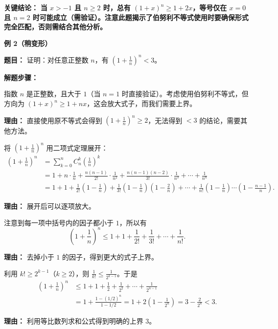 \begin{examplebox}
\textbf{\textcolor{CExample}{关键结论：}} \textbf{当 $x > -1$ 且 $n \geq 2$ 时，总有 $(1+x)^n \geq 1+2x$，等号仅在 $x=0$ 且 $n=2$ 时可能成立（需验证）。注意此题揭示了伯努利不等式使用时要确保形式完全匹配，否则需结合其他分析。}

\medskip
\textbf{\textcolor{CExample}{例 2（稍变形）}}

\textbf{\textcolor{CExample}{题目：}} 证明：对任意正整数 $n$，有 $\left(1+\frac{1}{n}\right)^n < 3$。

\textbf{\textcolor{CExample}{解题步骤：}}
\begin{description}[style=nextline, leftmargin=2.8em, labelsep=0.5em, itemsep=0.45em]
    \item[\textbf{第一步（观察指数）：}] 指数 $n$ 是正整数，且大于 $1$（当 $n=1$ 时直接验证）。考虑使用伯努利不等式，但方向为 $(1+x)^n \geq 1+nx$，这会放大式子，而我们需要上界。
    \par\textbf{理由：} 直接使用原不等式会得到 $\left(1+\frac{1}{n}\right)^n \geq 2$，无法得到 $<3$ 的结论，需要其他方法。

    \item[\textbf{第二步（利用二项式展开）：}] 将 $\left(1+\frac{1}{n}\right)^n$ 用二项式定理展开：
    \[
    \begin{aligned}
    \left(1+\frac{1}{n}\right)^n &= \sum_{k=0}^{n} C_n^k \left(\frac{1}{n}\right)^k \\
    &= 1 + n \cdot \frac{1}{n} + \frac{n(n-1)}{2!} \cdot \frac{1}{n^2} + \frac{n(n-1)(n-2)}{3!} \cdot \frac{1}{n^3} + \cdots + \frac{1}{n^n} \\
    &= 1 + 1 + \frac{1}{2!}\left(1-\frac{1}{n}\right) + \frac{1}{3!}\left(1-\frac{1}{n}\right)\left(1-\frac{2}{n}\right) + \cdots + \frac{1}{n!}\left(1-\frac{1}{n}\right)\cdots\left(1-\frac{n-1}{n}\right).
    \end{aligned}
    \]
    \par\textbf{理由：} 展开后可以逐项放大。

    \item[\textbf{第三步（逐项放大）：}] 注意到每一项中括号内的因子都小于 $1$，所以有
    \[
    \left(1+\frac{1}{n}\right)^n \leq 1 + 1 + \frac{1}{2!} + \frac{1}{3!} + \cdots + \frac{1}{n!}.
    \]
    \par\textbf{理由：} 去掉小于 $1$ 的因子，得到更大的式子上界。

    \item[\textbf{第四步（进一步放大）：}] 利用 $k! \geq 2^{k-1}$（$k \geq 2$），则 $\frac{1}{k!} \leq \frac{1}{2^{k-1}}$。于是
    \[
    \begin{aligned}
    \left(1+\frac{1}{n}\right)^n &\leq 1 + 1 + \frac{1}{2} + \frac{1}{2^2} + \cdots + \frac{1}{2^{n-1}} \\
    &= 1 + \frac{1 - (1/2)^n}{1 - 1/2} = 1 + 2\left(1 - \frac{1}{2^n}\right) = 3 - \frac{2}{2^n} < 3.
    \end{aligned}
    \]
    \par\textbf{理由：} 利用等比数列求和公式得到明确的上界 $3$。


\end{description}
\end{examplebox}
